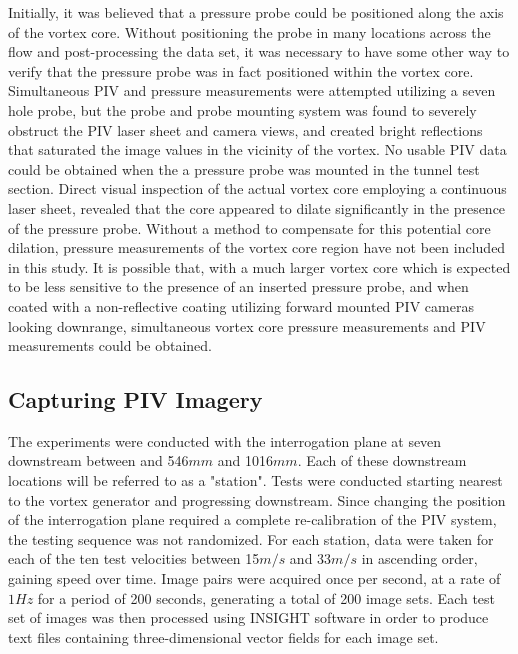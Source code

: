 Initially, it was believed that a pressure probe could be positioned 
along the axis of the vortex core. Without positioning the probe in many 
locations across the flow and post-processing the data set, it was necessary to 
have some other way to verify that the pressure probe was in fact positioned 
within the vortex core. Simultaneous PIV and pressure measurements were 
attempted utilizing a seven hole probe, but the probe and probe mounting system 
was found to severely obstruct the PIV laser sheet and camera views, and 
created bright reflections that saturated the image values in the vicinity of 
the vortex. No usable PIV data could be obtained when the a pressure probe was 
mounted in the tunnel test section. Direct visual inspection of the actual 
vortex core employing a continuous laser sheet, revealed that the core appeared 
to dilate significantly in the presence of the pressure probe. Without a method 
to compensate for this potential core dilation, pressure measurements of the 
vortex core region have not been included in this study. It is possible that, 
with a much larger vortex core which is expected to be less 
sensitive to the presence of an inserted pressure probe, and when coated with 
a non-reflective coating utilizing forward mounted PIV cameras looking 
downrange, simultaneous vortex core pressure measurements and PIV measurements 
could be obtained.

\subsection{Capturing PIV Imagery}

The experiments were conducted with the interrogation plane at seven 
downstream  between and 546$mm$ and 1016$mm$. Each of these downstream 
locations will be referred to as 
a "station". Tests were conducted starting nearest to the vortex 
generator and progressing downstream. Since changing the position of the 
interrogation plane required a complete re-calibration of the PIV system, the 
testing sequence was not randomized. For each station, data were taken for each 
of 
the ten test velocities between 15$m/s$ and 33$m/s$ in ascending order, gaining 
speed over time. Image pairs were acquired once per second, at a 
rate of $1Hz$ for a period of 200 seconds, generating a total of 200 image 
sets. Each test set of images was then processed using INSIGHT software in 
order to produce text files containing three-dimensional vector fields for each 
image set.


